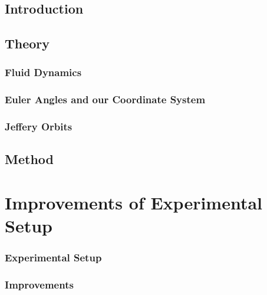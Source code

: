 \documentclass[]{report}
\begin{document}


\doublespacing



\setcounter{page}{1}
\pagestyle{fancy}
\setspecialhdr
\tableofcontents


\newpage
\setdefaulthdr
{}	
\setcounter{page}{1}

\chapter{Introduction}



\chapter{Theory}


\section{Fluid Dynamics}


\section{Euler Angles and our Coordinate System}


\section{Jeffery Orbits}


\chapter{Method}
\part{Improvements of Experimental Setup}
\section{Experimental Setup}

\section{Improvements}

\end{document}
